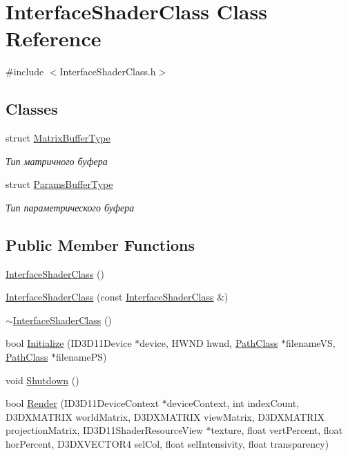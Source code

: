 \hypertarget{class_interface_shader_class}{}\section{Interface\+Shader\+Class Class Reference}
\label{class_interface_shader_class}


{\ttfamily \#include $<$Interface\+Shader\+Class.\+h$>$}

\subsection*{Classes}
\begin{DoxyCompactItemize}
\item 
struct \hyperlink{struct_interface_shader_class_1_1_matrix_buffer_type}{Matrix\+Buffer\+Type}
\begin{DoxyCompactList}\small\item\em Тип матричного буфера \end{DoxyCompactList}\item 
struct \hyperlink{struct_interface_shader_class_1_1_params_buffer_type}{Params\+Buffer\+Type}
\begin{DoxyCompactList}\small\item\em Тип параметрического буфера \end{DoxyCompactList}\end{DoxyCompactItemize}
\subsection*{Public Member Functions}
\begin{DoxyCompactItemize}
\item 
\hyperlink{class_interface_shader_class_a02042a5d6ee3c92e8013452c90c3faea}{Interface\+Shader\+Class} ()
\item 
\hyperlink{class_interface_shader_class_a31f5eeeec5f4e8dda02de938702cb55c}{Interface\+Shader\+Class} (const \hyperlink{class_interface_shader_class}{Interface\+Shader\+Class} \&)
\item 
\hyperlink{class_interface_shader_class_adca7c9cc05541fce00bf2a2a00a425ca}{$\sim$\+Interface\+Shader\+Class} ()
\item 
bool \hyperlink{class_interface_shader_class_a334689b607b80900776689e4f03ae217}{Initialize} (I\+D3\+D11\+Device $\ast$device, H\+W\+ND hwnd, \hyperlink{class_path_class}{Path\+Class} $\ast$filename\+VS, \hyperlink{class_path_class}{Path\+Class} $\ast$filename\+PS)
\item 
void \hyperlink{class_interface_shader_class_a95d8dff70bb4e5aa6def4298996c8e3c}{Shutdown} ()
\item 
bool \hyperlink{class_interface_shader_class_acabff7ea5640a15d614c36a34a5da9ce}{Render} (I\+D3\+D11\+Device\+Context $\ast$device\+Context, int index\+Count, D3\+D\+X\+M\+A\+T\+R\+IX world\+Matrix, D3\+D\+X\+M\+A\+T\+R\+IX view\+Matrix, D3\+D\+X\+M\+A\+T\+R\+IX projection\+Matrix, I\+D3\+D11\+Shader\+Resource\+View $\ast$texture, float vert\+Percent, float hor\+Percent, D3\+D\+X\+V\+E\+C\+T\+O\+R4 sel\+Col, float sel\+Intensivity, float transparency)
\end{DoxyCompactItemize}
